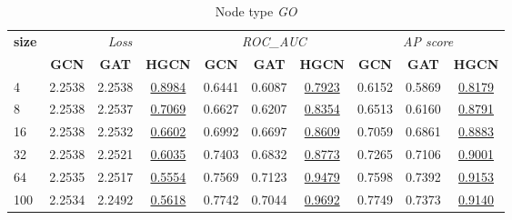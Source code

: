 \begin{table}
    \begin{subtable}[t]{\textwidth}
        \centering
        \begin{tabular}{l|ccc|ccc|ccc}   
             \toprule
                \multirow{2}{*}{\textbf{size}} & \multicolumn{3}{c}{\textit{Loss}} & \multicolumn{3}{c}{\textit{ROC\_AUC}} & \multicolumn{3}{c}{\textit{AP score}} \\
                & \textbf{GCN} & \textbf{GAT} & \textbf{HGCN} & \textbf{GCN} & \textbf{GAT} & \textbf{HGCN} & \textbf{GCN} & \textbf{GAT} & \textbf{HGCN} \\
                \midrule
                4 & 2.2538 & 2.2538 & \underline{0.8984} & 0.6441 & 0.6087 & \underline{0.7923} & 0.6152 & 0.5869 & \underline{0.8179} \\
                8 & 2.2538 & 2.2537 & \underline{0.7069} & 0.6627 & 0.6207 & \underline{0.8354} & 0.6513 & 0.6160 & \underline{0.8791} \\
                16 & 2.2538 & 2.2532 & \underline{0.6602} & 0.6992 & 0.6697 & \underline{0.8609} & 0.7059 & 0.6861 & \underline{0.8883} \\
                32 & 2.2538 & 2.2521 & \underline{0.6035} & 0.7403 & 0.6832 & \underline{0.8773} & 0.7265 & 0.7106 & \underline{0.9001} \\
                64 & 2.2535 & 2.2517 & \underline{0.5554} & 0.7569 & 0.7123 & \underline{0.9479} & 0.7598 & 0.7392 & \underline{0.9153} \\
                100 & 2.2534 & 2.2492 & \underline{0.5618} & 0.7742 & 0.7044 & \underline{0.9692} & 0.7749 & 0.7373 & \underline{0.9140} \\
                \bottomrule
        \end{tabular}
        \caption{Node type \textit{GO}}
    \end{subtable}
    
    \vspace{1em}
    

\end{table}
